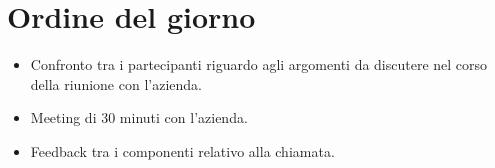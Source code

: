\section{Ordine del giorno}
\begin{itemize}
    \item Confronto tra i partecipanti riguardo agli argomenti da discutere nel 
		corso della riunione con l'azienda.
    \item Meeting di 30 minuti con l'azienda.
    \item Feedback tra i componenti relativo alla chiamata.
\end{itemize}

